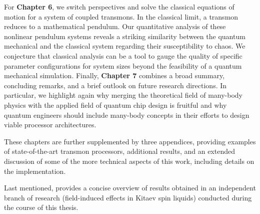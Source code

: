 For \textbf{Chapter 6}, we switch perspectives and solve the classical equations of motion for a system of coupled transmons. In the classical limit, a transmon reduces to a mathematical pendulum. Our quantitative analysis of these nonlinear pendulum systems reveals a striking similarity between the quantum mechanical and the classical system regarding their susceptibility to chaos. We conjecture that classical analysis can be a tool to gauge the quality of specific parameter configurations for system sizes beyond the feasibility of a quantum mechanical simulation.
Finally, \textbf{Chapter 7} combines a broad summary, concluding remarks, and a brief outlook on future research directions. In particular, we highlight again why merging the theoretical field of many-body physics with the applied field of quantum chip design is fruitful and why quantum engineers should include many-body concepts in their efforts to design viable processor architectures.

These chapters are further supplemented by three appendices, providing examples of state-of-the-art transmon processors, additional results, and an extended discussion of some of the more technical aspects of this work, including details on the implementation.

Last mentioned,  provides a concise overview of results obtained in an independent branch of research (field-induced effects in Kitaev spin liquids) conducted during the course of this thesis.